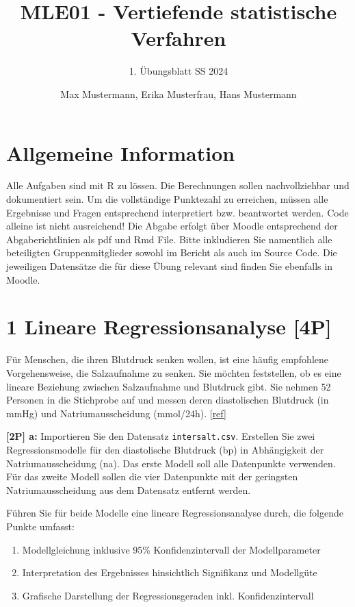 \documentclass[
]{article}
\title{MLE01 - Vertiefende statistische Verfahren}
\subtitle{1. Übungsblatt SS 2024}
\author{Max Mustermann, Erika Musterfrau, Hans Mustermann}
\date{}
\providecommand{\tightlist}{%
  \setlength{\itemsep}{0pt}\setlength{\parskip}{0pt}}
\begin{document}
\maketitle

\hypertarget{allgemeine-information}{%
\section{Allgemeine Information}\label{allgemeine-information}}

Alle Aufgaben sind mit R zu lössen. Die Berechnungen sollen
nachvollziehbar und dokumentiert sein. Um die vollständige Punktezahl zu
erreichen, müssen alle Ergebnisse und Fragen entsprechend interpretiert
bzw. beantwortet werden. Code alleine ist nicht ausreichend! Die Abgabe
erfolgt über Moodle entsprechend der Abgaberichtlinien als pdf und Rmd
File. Bitte inkludieren Sie namentlich alle beteiligten
Gruppenmitglieder sowohl im Bericht als auch im Source Code. Die
jeweiligen Datensätze die für diese Übung relevant sind finden Sie
ebenfalls in Moodle.

\hypertarget{lineare-regressionsanalyse-4p}{%
\section{1 Lineare Regressionsanalyse
{[}4P{]}}\label{lineare-regressionsanalyse-4p}}

Für Menschen, die ihren Blutdruck senken wollen, ist eine häufig
empfohlene Vorgehensweise, die Salzaufnahme zu senken. Sie möchten
feststellen, ob es eine lineare Beziehung zwischen Salzaufnahme und
Blutdruck gibt. Sie nehmen 52 Personen in die Stichprobe auf und messen
deren diastolischen Blutdruck (in mmHg) und Natriumausscheidung
(mmol/24h). {[}\href{https://doi.org/10.1136/bmj.297.6644.319}{ref}{]}

\textbf{{[}2P{]} a:} Importieren Sie den Datensatz
\texttt{intersalt.csv}. Erstellen Sie zwei Regressionsmodelle für den
diastolische Blutdruck (bp) in Abhängigkeit der Natriumausscheidung
(na). Das erste Modell soll alle Datenpunkte verwenden. Für das zweite
Modell sollen die vier Datenpunkte mit der geringsten
Natriumausscheidung aus dem Datensatz entfernt werden.

Führen Sie für beide Modelle eine lineare Regressionsanalyse durch, die
folgende Punkte umfasst:

\begin{enumerate}
\def\labelenumi{\roman{enumi})}
\tightlist
\item
  Modellgleichung inklusive 95\% Konfidenzintervall der Modellparameter
\item
  Interpretation des Ergebnisses hinsichtlich Signifikanz und Modellgüte
\item
  Grafische Darstellung der Regressionsgeraden inkl. Konfidenzintervall
\end{enumerate}
\end{document}
